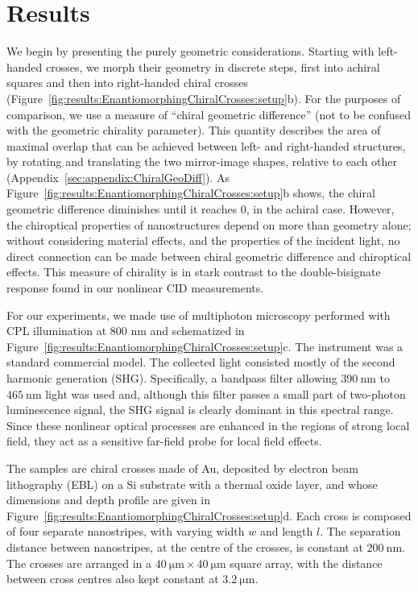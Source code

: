 \section{Results}\label{sec:results:EnantiomorphingChiralCrosses:results}

We begin by presenting the purely geometric considerations. Starting with left-handed crosses, we morph their geometry in discrete steps, first into achiral squares and then into right-handed chiral crosses (Figure~\ref{fig:results:EnantiomorphingChiralCrosses:setup}b). For the purposes of comparison, we use a measure of ``chiral geometric difference'' (not to be confused with the geometric chirality parameter). 
This quantity describes the area of maximal overlap that can be achieved between left- and right-handed structures, by rotating and translating the two mirror-image shapes, relative to each other (Appendix~\ref{sec:appendix:ChiralGeoDiff}). 
As Figure~\ref{fig:results:EnantiomorphingChiralCrosses:setup}b shows, the chiral geometric difference diminishes until it reaches 0, in the achiral case. However, the chiroptical properties of nanostructures depend on more than geometry alone; without considering material effects, and the properties of the incident light, no direct connection can be made between chiral geometric difference and chiroptical effects. This measure of chirality is in stark contrast to the double-bisignate response found in our nonlinear CID measurements.

For our experiments, we made use of multiphoton microscopy performed with CPL illumination at 800 nm and schematized in Figure~\ref{fig:results:EnantiomorphingChiralCrosses:setup}c. The instrument was a standard commercial model. The collected light consisted mostly of the second harmonic generation (SHG). Specifically, a bandpass filter allowing $\SI{390}{\nano\m}$ to $\SI{465}{\nano\m}$ light was used and, although this filter passes a small part of two-photon luminescence signal, the SHG signal is clearly dominant in this spectral range. Since these nonlinear optical processes are enhanced in the regions of strong local field, \cite{Wang2013, Chen1983} they act as a sensitive far-field probe for local field effects. 

The samples are chiral crosses made of Au, deposited by electron beam lithography (EBL) on a Si substrate with a thermal oxide layer, and whose dimensions and depth profile are given in Figure~\ref{fig:results:EnantiomorphingChiralCrosses:setup}d. Each cross is composed of four separate nanostripes, with varying width $w$ and length $l$. The separation distance between nanostripes, at the centre of the crosses, is constant at $\SI{200}{\nano\m}$. The crosses are arranged in a $\SI{40}{\micro\m} \times \SI{40}{\micro\m}$ square array, with the distance between cross centres also kept constant at $\SI{3.2}{\micro\m}$. 


